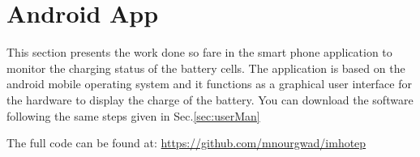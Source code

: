 \section{Android App}
This section presents the work done so fare in the smart phone application to monitor the charging status of the battery cells. The application is based on the android mobile operating system and it functions  as a graphical user interface for the hardware to display the charge of the battery. You can download the software following the same steps given in Sec.\ref{sec:userMan}

\vspace{0.3cm}%
\noindent\colorbox{myLavender!15}{\parbox{\textwidth}{\vspace{0.1cm}%
        The full code can be found at: \url{https://github.com/mnourgwad/imhotep}
        \vspace{0.1cm}}}

